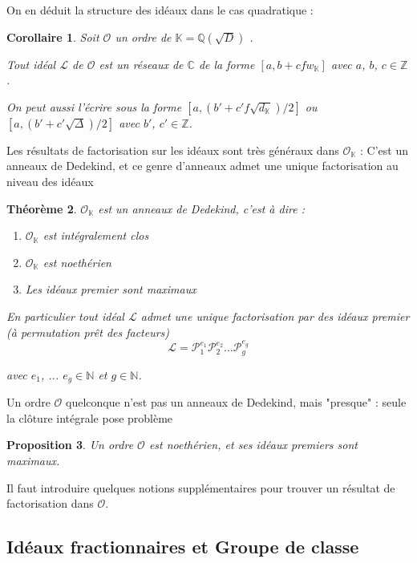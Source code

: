 \documentclass{article}
\newcommand{\N}[0]{\mathbb{N}}
\newcommand{\Z}[0]{\mathbb{Z}}
\newcommand{\Q}[0]{\mathbb{Q}}
\newcommand{\C}[0]{\mathbb{C}}
\newcommand{\K}[0]{\mathbb{K}}
\newcommand{\OR}[0]{\mathcal{O}}
\newcommand{\LR}[0]{\mathcal{L}}
\newcommand{\PR}[0]{\mathcal{P}}
\newtheorem{The}{Théorème}[section]
\newtheorem{Prop}[The]{Proposition}
\newtheorem{Coro}[The]{Corollaire}
\begin{document}
On en déduit la structure des idéaux dans le cas quadratique :

\begin{Coro}
	
	Soit $\OR$ un ordre de $\K = \Q(\sqrt{D})$ .
	
	Tout idéal $\LR$ de $\OR$ est un réseaux de $\C$ de la forme $\left[ a, b + cfw_{\K}\right]$ avec $a$, $b$, $c\in\Z$ . 
	
	On peut aussi l'écrire sous la forme $\left[ a, (b' + c'f\sqrt{d_{\K}})/2\right]$ ou $\left[ a, (b' + c'\sqrt{\Delta})/2\right]$ avec $b'$, $c'\in\Z$.
	
\end{Coro}

Les résultats de factorisation sur les idéaux sont très généraux dans $\OR_{\K}$ : C'est un anneaux de Dedekind, et ce genre d'anneaux admet une unique factorisation au niveau des idéaux

\begin{The}
	$\OR_{\K}$ est un anneaux de Dedekind, c'est à dire :
	\begin{enumerate}
		\item $\OR_{\K}$ est intégralement clos
		\item $\OR_{\K}$ est noethérien
		\item Les idéaux premier sont maximaux 
	\end{enumerate}
	
	En particulier tout idéal $\LR$ admet une unique factorisation par des idéaux premier (à permutation prêt des facteurs)
	\begin{equation*}
		\LR = \PR_{1}^{e_{1}}\PR_{2}^{e_{2}}\ldots\PR_{g}^{e_{g}}
	\end{equation*}
	
	avec $e_{1}$, ... $e_{g}\in\N$ et $g\in\N$.
	
\end{The}

Un ordre $\OR$ quelconque n'est pas un anneaux de Dedekind, mais "presque" : seule la clôture intégrale pose problème

\begin{Prop}
	Un ordre $\OR$ est noethérien, et ses idéaux premiers sont maximaux.
\end{Prop}

Il faut introduire quelques notions supplémentaires pour trouver un résultat de factorisation dans $\OR$.

\subsection{Idéaux fractionnaires et Groupe de classe}
\end{document}
